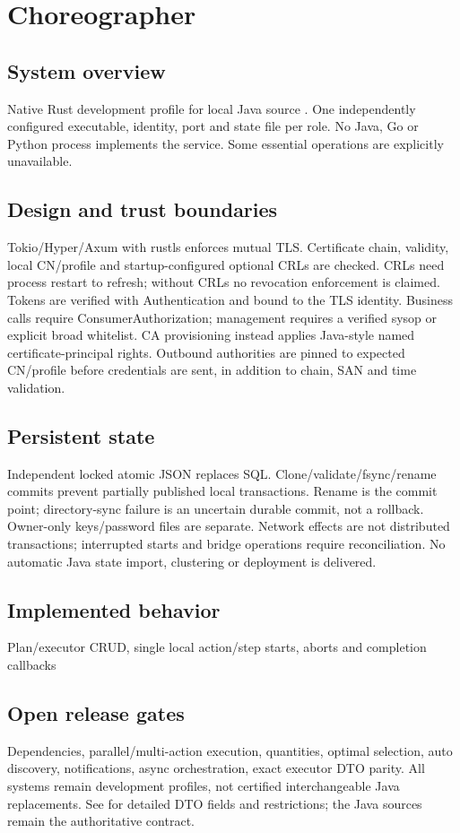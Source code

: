 \documentclass[a4paper]{arrowhead}
\begin{document}
\section{Choreographer}
\subsection{System overview}
Native Rust development profile for local Java source . One independently configured executable, identity, port and state file per role. No Java, Go or Python process implements the service. Some essential operations are explicitly unavailable.
\subsection{Design and trust boundaries}
Tokio/Hyper/Axum with rustls enforces mutual TLS. Certificate chain, validity, local CN/profile and startup-configured optional CRLs are checked. CRLs need process restart to refresh; without CRLs no revocation enforcement is claimed. Tokens are verified with Authentication and bound to the TLS identity. Business calls require ConsumerAuthorization; management requires a verified sysop or explicit broad whitelist. CA provisioning instead applies Java-style named certificate-principal rights. Outbound authorities are pinned to expected CN/profile before credentials are sent, in addition to chain, SAN and time validation.
\subsection{Persistent state}
Independent locked atomic JSON replaces SQL. Clone/validate/fsync/rename commits prevent partially published local transactions. Rename is the commit point; directory-sync failure is an uncertain durable commit, not a rollback. Owner-only keys/password files are separate. Network effects are not distributed transactions; interrupted starts and bridge operations require reconciliation. No automatic Java state import, clustering or deployment is delivered.
\subsection{Implemented behavior}
Plan/executor CRUD, single local action/step starts, aborts and completion callbacks
\subsection{Open release gates}
Dependencies, parallel/multi-action execution, quantities, optimal selection, auto discovery, notifications, async orchestration, exact executor DTO parity. All systems remain development profiles, not certified interchangeable Java replacements. See  for detailed DTO fields and restrictions; the Java sources remain the authoritative contract.
\end{document}
